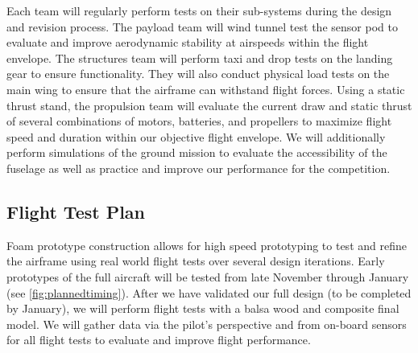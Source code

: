 \documentclass[proposal]{byu-aero}
\begin{document}
Each team will regularly perform tests on their sub-systems during the design and revision process. The payload team will wind tunnel test the sensor pod to evaluate and improve aerodynamic stability at airspeeds within the flight envelope.  The structures team will perform taxi and drop tests on the landing gear to ensure functionality. They will also conduct physical load tests on the main wing to ensure that the airframe can withstand flight forces. Using a static thrust stand, the propulsion team will evaluate the current draw and static thrust of several combinations of motors, batteries, and propellers to maximize flight speed and duration within our objective flight envelope. We will additionally perform simulations of the ground mission to evaluate the accessibility of the fuselage as well as practice and improve our performance for the competition.

\subsection{Flight Test Plan}

Foam prototype construction allows for high speed prototyping to test and refine the airframe using real world flight tests over several design iterations. Early prototypes of the full aircraft will be tested from late November through January (see \cref{fig:plannedtiming}).  After we have validated our full design (to be completed by January), we will perform flight tests with a balsa wood and composite final model. We will gather data via the pilot's perspective and from on-board sensors for all flight tests to evaluate and improve flight performance.

%
\end{document}
